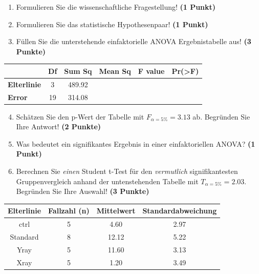 \documentclass[a4paper, 9pt]{scrartcl}\usepackage[]{graphicx}\usepackage[]{xcolor}
\newenvironment{knitrout}{}{} %
\begin{document}
\begin{enumerate}
  \item Formulieren Sie die wissenschaftliche Fragestellung! \textbf{(1 Punkt)}
  \item Formulieren Sie das statistische Hypothesenpaar! \textbf{(1 Punkt)}
\item Füllen Sie die unterstehende einfaktorielle ANOVA Ergebnistabelle aus! \textbf{(3 Punkte)}
\end{enumerate}

\vspace{1Ex}

\begin{center}
  \Large
  \begin{tabular}{lccccp{3cm}}
\toprule
     & \textbf{Df} & \textbf{Sum Sq} & \textbf{Mean Sq} & \textbf{F value} & \textbf{Pr(>F)} \strut\\
    \midrule
   \textbf{Elterlinie}  & 3 & 489.92 &  &  &  \strut\\
   \textbf{Error}  & 19 & 314.08 &  &  &  \strut\\
\bottomrule
  \end{tabular}
\end{center}

\vspace{1Ex}

\begin{enumerate}
  \setcounter{enumi}{3}
\item Schätzen Sie den p-Wert der Tabelle mit $F_{\alpha = 5\%} = 3.13$ ab. Begründen Sie Ihre Antwort! \textbf{(2 Punkte)}
\item Was bedeutet ein signifikantes Ergebnis in einer einfaktoriellen ANOVA? \textbf{(1 Punkt)}
\item Berechnen Sie \textit{einen} Student t-Test für den \textit{vermutlich} signifikantesten Gruppenvergleich anhand der untenstehenden Tabelle mit $T_{\alpha = 5\%} = 2.03$. Begründen Sie Ihre Auswahl! \textbf{(3 Punkte)}
\end{enumerate}


\begin{knitrout}
\color{fgcolor}\begin{table}[!h]
\centering\begingroup\fontsize{11}{13}\selectfont

\begin{tabular}{cccc}
\toprule
\textbf{Elterlinie} & \textbf{Fallzahl (n)} & \textbf{Mittelwert} & \textbf{Standardabweichung}\\
\midrule
ctrl & 5 & 4.60 & 2.97\\
Standard & 8 & 12.12 & 5.22\\
Yray & 5 & 11.60 & 3.13\\
Xray & 5 & 1.20 & 3.49\\
\bottomrule
\end{tabular}
\endgroup{}
\end{table}

\end{knitrout}
\end{document}
